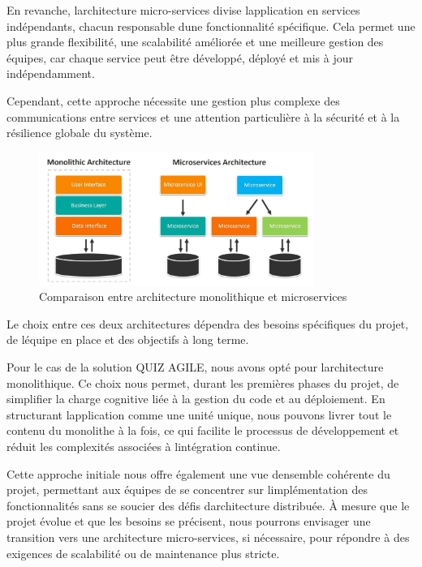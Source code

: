 \documentclass[12pt,a4paper,twoside]{report}
\begin{document}
En revanche, l\textquotesingle architecture micro-services divise
l\textquotesingle application en services indépendants, chacun
responsable d\textquotesingle une fonctionnalité spécifique. Cela permet
une plus grande flexibilité, une scalabilité améliorée et une meilleure
gestion des équipes, car chaque service peut être développé, déployé et
mis à jour indépendamment.

Cependant, cette approche nécessite une gestion plus complexe des
communications entre services et une attention particulière à la
sécurité et à la résilience globale du système.

\begin{figure}[H]
\centering
\includegraphics[width=0.8\textwidth]{latex_media/media/image15.jpeg}
\caption{Comparaison entre architecture monolithique et microservices}
\label{fig:comparaison-architectures}
\end{figure}

Le
choix entre ces deux architectures dépendra des besoins spécifiques du
projet, de l\textquotesingle équipe en place et des objectifs à long
terme.

Pour le cas de la solution QUIZ AGILE, nous avons opté pour
l\textquotesingle architecture monolithique. Ce choix nous permet,
durant les premières phases du projet, de simplifier la charge cognitive
liée à la gestion du code et au déploiement. En structurant
l\textquotesingle application comme une unité unique, nous pouvons
livrer tout le contenu du monolithe à la fois, ce qui facilite le
processus de développement et réduit les complexités associées à
l\textquotesingle intégration continue.

Cette approche initiale nous offre également une vue
d\textquotesingle ensemble cohérente du projet, permettant aux équipes
de se concentrer sur l\textquotesingle implémentation des
fonctionnalités sans se soucier des défis d\textquotesingle architecture
distribuée. À mesure que le projet évolue et que les besoins se
précisent, nous pourrons envisager une transition vers une architecture
micro-services, si nécessaire, pour répondre à des exigences de
scalabilité ou de maintenance plus stricte.
\end{document}
